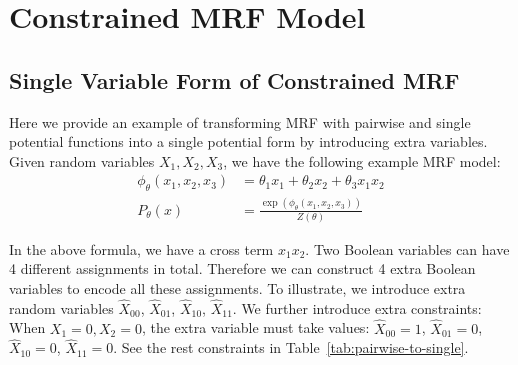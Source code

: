 \section{Constrained MRF Model}\label{appendix:constrain-mrf}

\subsection{Single Variable Form of Constrained MRF}  \label{appendix:svf}
Here we provide an example of transforming MRF with pairwise and single potential functions into a single potential form by introducing extra variables. Given random variables $X_1,X_2,X_3$, we have the following example MRF model:
\begin{align*}
\phi_{\theta}(x_1,x_2,x_3)&=\theta_1 x_1+\theta_2 x_2+\theta_3 x_1 x_2\\
P_{\theta}(x)&=\frac{\exp(\phi_{\theta}(x_1,x_2,x_3))}{Z({\theta})}
\end{align*}

In the above formula, we have a cross term $x_1 x_2$. Two Boolean variables can have 4 different assignments in total. Therefore we can construct 4 extra Boolean variables to encode all these assignments. To illustrate, we introduce extra random variables $\hat{X}_{00}$, $\hat{X}_{01}$, $\hat{X}_{10}$, $\hat{X}_{11}$. We further introduce extra constraints:
 When $X_1=0,X_2=0$, the extra variable must take values: $\hat{X}_{00}=1$, $\hat{X}_{01}=0$, $\hat{X}_{10}=0$, $\hat{X}_{11}=0$. See the rest constraints in Table~\ref{tab:pairwise-to-single}.

